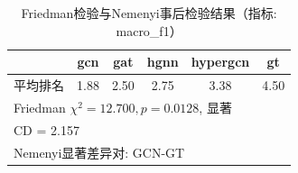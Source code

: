 \begin{table}[htbp]
\centering
\caption{Friedman检验与Nemenyi事后检验结果（指标: macro\_f1）}
\label{tab:friedman_macro_f1}
\begin{tabular}{lccccc}
\toprule
 & gcn & gat & hgnn & hypergcn & gt \\
\midrule
平均排名 & 1.88 & 2.50 & 2.75 & 3.38 & 4.50 \\
\midrule
\multicolumn{6}{l}{Friedman $\chi^2 = 12.700, p = 0.0128$, 显著} \\
\multicolumn{6}{l}{CD = 2.157} \\
\multicolumn{6}{l}{Nemenyi显著差异对: GCN-GT} \\
\bottomrule
\end{tabular}
\end{table}